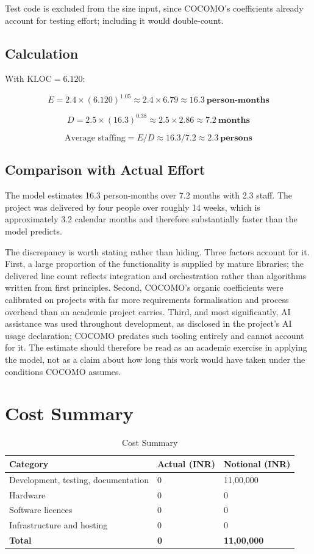 \documentclass[
12pt,
a4paper,
oneside
]{report}
\begin{document}
Test code is excluded from the size input, since COCOMO's coefficients already
account for testing effort; including it would double-count.

\subsection{Calculation}

With $\mathrm{KLOC} = 6.120$:

\[
E = 2.4 \times (6.120)^{1.05} \approx 2.4 \times 6.79 \approx
\mathbf{16.3\ \text{person-months}}
\]

\[
D = 2.5 \times (16.3)^{0.38} \approx 2.5 \times 2.86 \approx
\mathbf{7.2\ \text{months}}
\]

\[
\text{Average staffing} = E / D \approx 16.3 / 7.2 \approx
\mathbf{2.3\ \text{persons}}
\]

\subsection{Comparison with Actual Effort}

The model estimates 16.3 person-months over 7.2 months with 2.3 staff. The
project was delivered by four people over roughly 14 weeks, which is
approximately 3.2 calendar months and therefore substantially faster than the
model predicts.

The discrepancy is worth stating rather than hiding. Three factors account for
it. First, a large proportion of the functionality is supplied by mature
libraries; the delivered line count reflects integration and orchestration
rather than algorithms written from first principles. Second, COCOMO's organic
coefficients were calibrated on projects with far more requirements
formalisation and process overhead than an academic project carries. Third, and
most significantly, AI assistance was used throughout development, as disclosed
in the project's AI usage declaration; COCOMO predates such tooling entirely and
cannot account for it. The estimate should therefore be read as an academic
exercise in applying the model, not as a claim about how long this work would
have taken under the conditions COCOMO assumes.

\section{Cost Summary}

\begin{table}[H]
\centering
\begin{tabular}{|p{6cm}|p{2.8cm}|p{3.2cm}|}
\hline
\textbf{Category} & \textbf{Actual (INR)} & \textbf{Notional (INR)} \\
\hline
Development, testing, documentation & 0 & 11{,}00{,}000 \\
\hline
Hardware & 0 & 0 \\
\hline
Software licences & 0 & 0 \\
\hline
Infrastructure and hosting & 0 & 0 \\
\hline
\textbf{Total} & \textbf{0} & \textbf{11{,}00{,}000} \\
\hline
\end{tabular}
\caption{Cost Summary}
\end{table}
\end{document}
